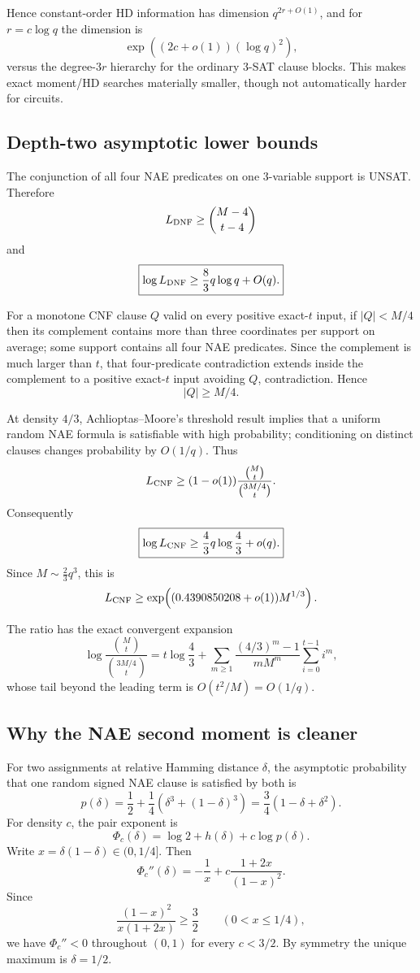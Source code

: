 \documentclass[11pt]{article}
\begin{document}
Hence constant-order HD information has dimension $q^{2r+O(1)}$, and for $r=c\log q$ the dimension is
\[
\exp\!\left((2c+o(1))(\log q)^2\right),
\]
versus the degree-$3r$ hierarchy for the ordinary 3-SAT clause blocks. This makes exact moment/HD searches materially smaller, though not automatically harder for circuits.

\subsection{Depth-two asymptotic lower bounds}
The conjunction of all four NAE predicates on one 3-variable support is UNSAT. Therefore
\[
L_{\rm DNF}\ge\binom{M-4}{t-4}
\]
and
\[
\boxed{
\log L_{\rm DNF}
\ge
\frac83 q\log q+O(q).
}
\]

For a monotone CNF clause $Q$ valid on every positive exact-$t$ input, if $|Q|<M/4$ then its complement contains more than three coordinates per support on average; some support contains all four NAE predicates. Since the complement is much larger than $t$, that four-predicate contradiction extends inside the complement to a positive exact-$t$ input avoiding $Q$, contradiction. Hence
\[
|Q|\ge M/4.
\]

At density $4/3$, Achlioptas--Moore's threshold result implies that a uniform random NAE formula is satisfiable with high probability; conditioning on distinct clauses changes probability by $O(1/q)$. Thus
\[
L_{\rm CNF}
\ge
(1-o(1))
\frac{\binom Mt}{\binom{3M/4}{t}}.
\]
Consequently
\[
\boxed{
\log L_{\rm CNF}
\ge
\frac43 q\log\frac43+o(q).
}
\]
Since $M\sim\frac23q^3$, this is
\[
L_{\rm CNF}\ge
\exp\!\left((0.4390850208+o(1))M^{1/3}\right).
\]

The ratio has the exact convergent expansion
\[
\log\frac{\binom Mt}{\binom{3M/4}{t}}
=
t\log\frac43+
\sum_{m\ge1}
\frac{(4/3)^m-1}{mM^m}
\sum_{i=0}^{t-1}i^m,
\]
whose tail beyond the leading term is $O(t^2/M)=O(1/q)$.

\subsection{Why the NAE second moment is cleaner}
For two assignments at relative Hamming distance $\delta$, the asymptotic probability that one random signed NAE clause is satisfied by both is
\[
p(\delta)
=
\frac12+\frac14\left(\delta^3+(1-\delta)^3\right)
=
\frac34(1-\delta+\delta^2).
\]
For density $c$, the pair exponent is
\[
\Phi_c(\delta)
=
\log2+h(\delta)+c\log p(\delta).
\]
Write $x=\delta(1-\delta)\in(0,1/4]$. Then
\[
\Phi_c''(\delta)
=
-\frac1x+c\frac{1+2x}{(1-x)^2}.
\]
Since
\[
\frac{(1-x)^2}{x(1+2x)}\ge\frac32
\qquad(0<x\le1/4),
\]
we have $\Phi_c''<0$ throughout $(0,1)$ for every $c<3/2$. By symmetry the unique maximum is $\delta=1/2$.
\end{document}
